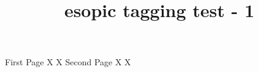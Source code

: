 \documentclass[a4paper,twoside]{article}
\title{esopic tagging test - 1}
\begin{document}
  \Huge \bfseries

\noindent
\hrulefill First Page\hrulefill
\vfill
\noindent
X \hfill X
\newpage
\noindent
\hrulefill Second Page\hrulefill
\vfill
\noindent
X \hfill X
\end{document}
